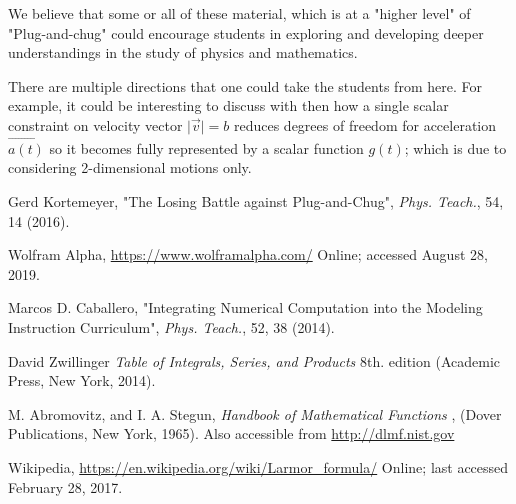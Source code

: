 \documentclass[journal]{IEEEtran}
\begin{document}
\par We believe that some or all of these material, which is at a "higher level" of "Plug-and-chug" could encourage students in exploring and developing deeper understandings in the study of physics and mathematics.  
\par There are multiple directions that one could take the students from here.  For example, it could be interesting to discuss with then how a single scalar constraint on velocity vector $\vert\vec{v}\vert=b$ reduces degrees of freedom for acceleration $\vec{a(t)}$ so it becomes fully represented by a scalar function $g(t)$; which is due to considering 2-dimensional motions only.


\begin{thebibliography}{99}

 Gerd Kortemeyer, "The Losing Battle against Plug-and-Chug", {\it Phys. Teach.\/}, 54, 14 (2016).

 Wolfram Alpha, {\url{https://www.wolframalpha.com/}}
Online; accessed August 28, 2019.

 Marcos D. Caballero, "Integrating Numerical Computation into the Modeling Instruction Curriculum", {\it Phys. Teach.\/}, 52, 38 (2014).

 David Zwillinger {\it Table of Integrals, Series, and Products \/} 8th. edition (Academic Press, New York, 2014).

 M. Abromovitz, and I. A. Stegun,  {\it Handbook of Mathematical Functions \/}, (Dover Publications, New York, 1965). Also accessible from {\url{http://dlmf.nist.gov}}

 Wikipedia, {\url{https://en.wikipedia.org/wiki/Larmor_formula/}} Online; last accessed February 28, 2017.

\end{thebibliography}

% 
\end{document}
